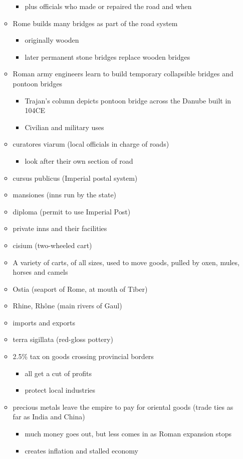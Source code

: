 \documentclass[12pt, twoside]{article}
\begin{document}
\begin{itemize}
\begin{itemize}
\begin{itemize}
	\item plus officials who made or repaired the road and when
	\end{itemize}
\item Rome builds many bridges as part of the road system
	\begin{itemize}
	\item originally wooden
	\item later permanent stone bridges replace wooden bridges
	\end{itemize}
\item Roman army engineers learn to build temporary collapsible bridges and pontoon bridges
	\begin{itemize}
	\item  Trajan’s column depicts pontoon bridge across the Danube built in 104CE
	\item  Civilian and military uses
	\end{itemize}
\item curatores viarum (local officials in charge of roads)
	\begin{itemize}
	\item look after their own section of road
	\end{itemize}
\item cursus publicus (Imperial postal system)
\item mansiones (inns run by the state)
\item diploma (permit to use Imperial Post)
\item private inns and their facilities
\item cisium (two-wheeled cart)
\item A variety of carts, of all sizes, used to move goods, pulled by oxen, mules, horses and camels
\item Ostia (seaport of Rome, at mouth of Tiber)
\item Rhine, Rhône (main rivers of Gaul)
\item imports and exports
\item terra sigillata (red-gloss pottery)
\item 2.5\% tax on goods crossing provincial borders
	\begin{itemize}
	\item all get a cut of profits
	\item protect local industries
	\end{itemize}
\item precious metals leave the empire to pay for oriental goods (trade ties as far as India and China)
	\begin{itemize}
	\item much money goes out, but less comes in as Roman expansion stops
	\item creates inflation and stalled economy
	\end{itemize}
\end{itemize}	


\end{itemize}
\end{document}
